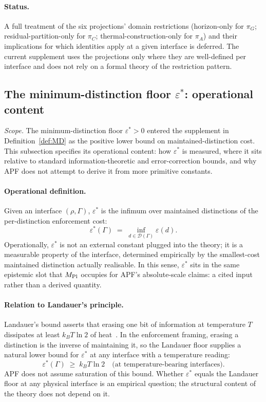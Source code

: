 \documentclass[11pt]{article}
\theoremstyle{plain}
\theoremstyle{definition}
\theoremstyle{remark}
\begin{document}
\paragraph{Status.}  A full treatment of the six projections' domain restrictions (horizon-only for $\pi_G$; residual-partition-only for $\pi_C$; thermal-construction-only for $\pi_A$) and their implications for which identities apply at a given interface is deferred.  The current supplement uses the projections only where they are well-defined per interface and does not rely on a formal theory of the restriction pattern.

\bigskip

\subsection{The minimum-distinction floor $\varepsilon^*$: operational content}\label{supp:A4}

\noindent\textit{Scope.}  The minimum-distinction floor $\varepsilon^* > 0$ entered the supplement in Definition~\ref{def:MD} as the positive lower bound on maintained-distinction cost.  This subsection specifies its operational content: how $\varepsilon^*$ is measured, where it sits relative to standard information-theoretic and error-correction bounds, and why APF does not attempt to derive it from more primitive constants.

\paragraph{Operational definition.}  Given an interface $(\rho, \Gamma)$, $\varepsilon^*$ is the infimum over maintained distinctions of the per-distinction enforcement cost:
\[
  \varepsilon^*(\Gamma) \;=\; \inf_{d \in \mathcal{D}(\Gamma)} \varepsilon(d).
\]
Operationally, $\varepsilon^*$ is not an external constant plugged into the theory; it is a measurable property of the interface, determined empirically by the smallest-cost maintained distinction actually realisable.  In this sense, $\varepsilon^*$ sits in the same epistemic slot that $M_{\rm Pl}$ occupies for APF's absolute-scale claims: a cited input rather than a derived quantity.

\paragraph{Relation to Landauer's principle.}  Landauer's bound asserts that erasing one bit of information at temperature $T$ dissipates at least $k_B T \ln 2$ of heat~\cite{Landauer1961}.  In the enforcement framing, erasing a distinction is the inverse of maintaining it, so the Landauer floor supplies a natural lower bound for $\varepsilon^*$ at any interface with a temperature reading:
\[
  \varepsilon^*(\Gamma) \;\geq\; k_B T \ln 2 \quad \text{(at temperature-bearing interfaces)}.
\]
APF does not assume saturation of this bound.  Whether $\varepsilon^*$ equals the Landauer floor at any physical interface is an empirical question; the structural content of the theory does not depend on it.
\end{document}
